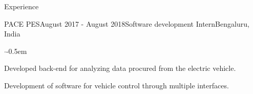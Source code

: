 \documentclass{CV} %
\begin{document}
\begin{rSection}{Experience}


  \begin{rSubsection}{PACE PES}{August 2017 - August 2018}{Software development Intern}{Bengaluru, India}
    \begin{list}{$\cdot$}{\footnotesize}\itemsep -0.5em \vspace{-0.5em}
      \item Developed back-end for analyzing data procured from the electric vehicle.
      \item Development of software for vehicle control through multiple interfaces.
    \end{list}
  \end{rSubsection}
  
\end{rSection}



\end{document}
